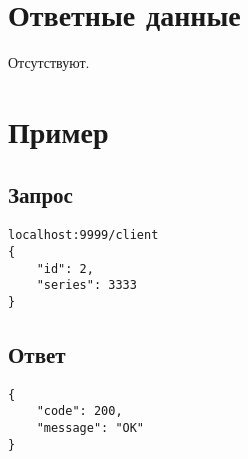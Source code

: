 \section*{Ответные данные}
Отсутствуют.

\section*{Пример}

\subsection*{Запрос}

\begin{lstlisting}
localhost:9999/client
{
	"id": 2,
	"series": 3333
}
\end{lstlisting}
\hfill

\subsection*{Ответ}

\begin{lstlisting}
{
	"code": 200,
	"message": "OK"
}
\end{lstlisting}
\hfill
